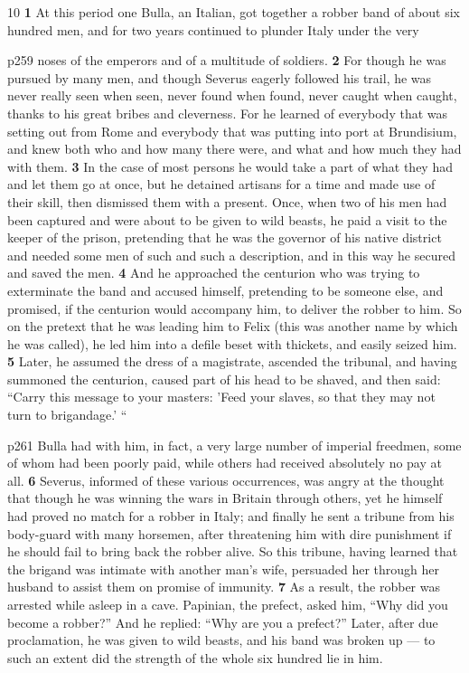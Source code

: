 10
\textbf{1} At this period one Bulla, an Italian, got together a robber band of about six hundred men, and for two years continued to plunder Italy under the very

p259 noses of the emperors and of a multitude of soldiers. \textbf{2} For though he was pursued by many men, and though Severus eagerly followed his trail, he was never really seen when seen, never found when found, never caught when caught, thanks to his great bribes and cleverness. For he learned of everybody that was setting out from Rome and everybody that was putting into port at Brundisium, and knew both who and how many there were, and what and how much they had with them. \textbf{3} In the case of most persons he would take a part of what they had and let them go at once, but he detained artisans for a time and made use of their skill, then dismissed them with a present. Once, when two of his men had been captured and were about to be given to wild beasts, he paid a visit to the keeper of the prison, pretending that he was the governor of his native district and needed some men of such and such a description, and in this way he secured and saved the men. \textbf{4} And he approached the centurion who was trying to exterminate the band and accused himself, pretending to be someone else, and promised, if the centurion would accompany him, to deliver the robber to him. So on the pretext that he was leading him to Felix (this was another name by which he was called), he led him into a defile beset with thickets, and easily seized him. \textbf{5} Later, he assumed the dress of a magistrate, ascended the tribunal, and having summoned the centurion, caused part of his head to be shaved, and then said: ``Carry this message to your masters: 'Feed your slaves, so that they may not turn to brigandage.' ``

p261 Bulla had with him, in fact, a very large number of imperial freedmen, some of whom had been poorly paid, while others had received absolutely no pay at all. \textbf{6} Severus, informed of these various occurrences, was angry at the thought that though he was winning the wars in Britain through others, yet he himself had proved no match for a robber in Italy; and finally he sent a tribune from his body-guard with many horsemen, after threatening him with dire punishment if he should fail to bring back the robber alive. So this tribune, having learned that the brigand was intimate with another man's wife, persuaded her through her husband to assist them on promise of immunity. \textbf{7} As a result, the robber was arrested while asleep in a cave. Papinian, the prefect, asked him, ``Why did you become a robber?'' And he replied: ``Why are you a prefect?'' Later, after due proclamation, he was given to wild beasts, and his band was broken up \texthebrew{—} to such an extent did the strength of the whole six hundred lie in him.

